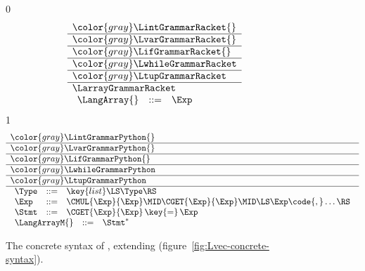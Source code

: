 \documentclass[7x10]{TimesAPriori_MIT}%
\newcommand{\gray}[1]{{\color{gray} #1}}
\def\racketEd{0}
\def\pythonEd{1}
\def\edition{0}
\numberwithin{theorem}{chapter}
\numberwithin{definition}{chapter}
\numberwithin{equation}{chapter}
\begin{document}
\newcommand{\LarrayGrammarPython}{
\begin{array}{lcl}
  \Type &::=& \key{list}\LS\Type\RS \\
  \Exp &::=& \CMUL{\Exp}{\Exp}
    \MID \CGET{\Exp}{\Exp}
    \MID \LS \Exp \code{,} \ldots \RS \\
  \Stmt &::= & \CGET{\Exp}{\Exp} \mathop{\key{=}}\Exp
\end{array}
}
\newcommand{\LarrayASTPython}{
\begin{array}{lcl}
  \Type &::=& \key{ListType}\LP\Type\RP \\
  \Exp &::=& \MUL{\Exp}{\Exp}
    \MID \GET{\Exp}{\Exp} \\
    &\MID& \key{List}\LP \Exp \code{,} \ldots \code{, } \code{Load()} \RP \\
  \Stmt &::= & \ASSIGN{ \PUT{\Exp}{\Exp} }{\Exp}
\end{array}
}

\begin{figure}[tp]
\centering
\begin{tcolorbox}[colback=white]
    \small
{\if\edition\racketEd    
\[
\begin{array}{l}
  \gray{\LintGrammarRacket{}} \\ \hline
  \gray{\LvarGrammarRacket{}} \\ \hline
  \gray{\LifGrammarRacket{}} \\ \hline
  \gray{\LwhileGrammarRacket} \\ \hline
  \gray{\LtupGrammarRacket} \\ \hline
  \LarrayGrammarRacket \\
\begin{array}{lcl}
  \LangArray{} &::=& \Exp
\end{array}
\end{array}
\]
\fi}
{\if\edition\pythonEd    
\[
\begin{array}{l}
  \gray{\LintGrammarPython{}} \\ \hline
  \gray{\LvarGrammarPython{}} \\ \hline
  \gray{\LifGrammarPython{}} \\ \hline
  \gray{\LwhileGrammarPython} \\ \hline
  \gray{\LtupGrammarPython} \\ \hline
  \LarrayGrammarPython \\
\begin{array}{rcl}
  \LangArrayM{} &::=& \Stmt^{*}
\end{array}
\end{array}
\]
\fi}
\end{tcolorbox}
\caption{The concrete syntax of \LangArray{}, extending \LangVec{} (figure~\ref{fig:Lvec-concrete-syntax}).}
\label{fig:Lvecof-concrete-syntax}
\end{figure}
\end{document}
